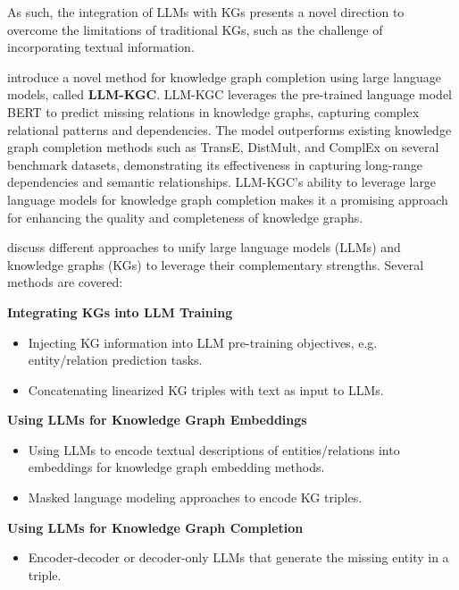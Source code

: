 \documentclass{article}
\begin{document}
As such, the integration of LLMs with KGs presents a novel direction to overcome the limitations of traditional KGs, such as the challenge of incorporating textual information. 

\textbf{\cite{ullah2021llm-kgc}} introduce a novel method for knowledge graph completion using large language models, called \textbf{LLM-KGC}. LLM-KGC leverages the pre-trained language model BERT to predict missing relations in knowledge graphs, capturing complex relational patterns and dependencies. The model outperforms existing knowledge graph completion methods such as TransE, DistMult, and ComplEx on several benchmark datasets, demonstrating its effectiveness in capturing long-range dependencies and semantic relationships. LLM-KGC's ability to leverage large language models for knowledge graph completion makes it a promising approach for enhancing the quality and completeness of knowledge graphs.

\textbf{\cite{pan2023unifying}} discuss different approaches to unify large language models (LLMs) and knowledge graphs (KGs) to leverage their complementary strengths. Several methods are covered:



\textbf{Integrating KGs into LLM Training}
\begin{itemize}
  \item Injecting KG information into LLM pre-training objectives, e.g. entity/relation prediction tasks. 
  \item Concatenating linearized KG triples with text as input to LLMs. 
\end{itemize}

\textbf{Using LLMs for Knowledge Graph Embeddings}
\begin{itemize}
  \item Using LLMs to encode textual descriptions of entities/relations into embeddings for knowledge graph embedding methods. 
  \item Masked language modeling approaches to encode KG triples. 
\end{itemize}

\textbf{Using LLMs for Knowledge Graph Completion}
\begin{itemize}
  \item Encoder-decoder or decoder-only LLMs that generate the missing entity in a triple. 
\end{itemize}
\end{document}
